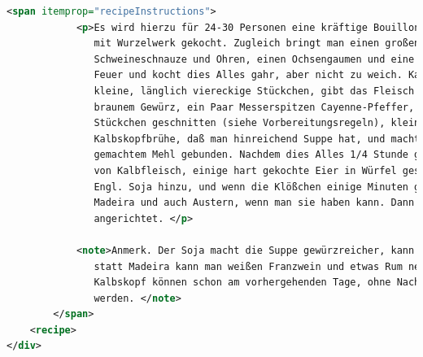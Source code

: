 \documentclass[12pt, twoside]{report}
\begin{document}
\begin{lstlisting}[language=XML]
		<span itemprop="recipeInstructions">
			<p>Es wird hierzu für 24-30 Personen eine kräftige Bouillon von 8-10 Pfund Rindfleisch
               mit Wurzelwerk gekocht. Zugleich bringt man einen großen Kalbskopf, eine
               Schweineschnauze und Ohren, einen Ochsengaumen und eine geräucherte Ochsenzunge zu
               Feuer und kocht dies Alles gahr, aber nicht zu weich. Kalt, schneidet man es in
               kleine, länglich viereckige Stückchen, gibt das Fleisch in die Bouillon, nebst
               braunem Gewürz, ein Paar Messerspitzen Cayenne-Pfeffer, einige Kalbsmidder in
               Stückchen geschnitten (siehe Vorbereitungsregeln), kleine Saucissen, so viel
               Kalbskopfbrühe, daß man hinreichend Suppe hat, und macht dies mit in Butter braun
               gemachtem Mehl gebunden. Nachdem dies Alles 1/4 Stunde gekocht hat, kommen noch Klöße
               von Kalbfleisch, einige hart gekochte Eier in Würfel geschnitten, ein Paar Eßlöffel
               Engl. Soja hinzu, und wenn die Klößchen einige Minuten gekocht haben, 1/2 Flasche
               Madeira und auch Austern, wenn man sie haben kann. Dann wird die Suppe sogleich
               angerichtet. </p>

            <note>Anmerk. Der Soja macht die Suppe gewürzreicher, kann jedoch gut wegbleiben, und
               statt Madeira kann man weißen Franzwein und etwas Rum nehmen. Sowohl die Bouillon als
               Kalbskopf können schon am vorhergehenden Tage, ohne Nachtheil der Suppe, gekocht
               werden. </note>
		</span>
	<recipe>
</div>		
\end{lstlisting}

\printbibliography
\end{document}
